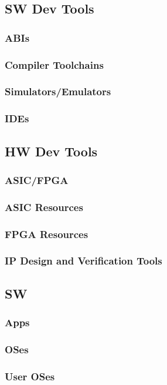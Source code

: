 \documentclass[10pt,a4paper]{article}
\begin{document}
    \subsection{SW Dev Tools}
      \subsubsection{ABIs}
      \subsubsection{Compiler Toolchains}
      \subsubsection{Simulators/Emulators}
      \subsubsection{IDEs}
    \subsection{HW Dev Tools}
      \subsubsection{ASIC/FPGA}
      \subsubsection{ASIC Resources}
      \subsubsection{FPGA Resources}
      \subsubsection{IP Design and Verification Tools}
    \subsection{SW}
      \subsubsection{Apps}
      \subsubsection{OSes}
      \subsubsection{User OSes}
\end{document}
